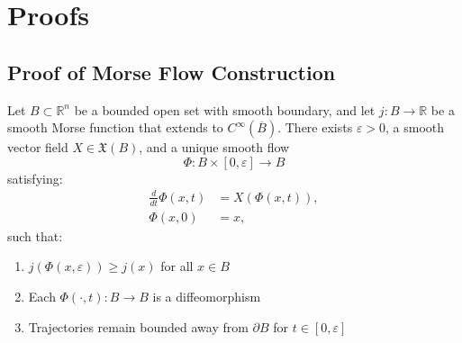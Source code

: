 \newpage
\appendix
\onecolumn

\section{Proofs}
\subsection{Proof of Morse Flow Construction}
\label{proof morse flow construction}
\begin{proposition}
\label{thm:main-generalized}
Let \( B \subset \mathbb{R}^n \) be a bounded open set with smooth boundary, and let \( j: B \to \mathbb{R} \) be a smooth Morse function that extends to \( C^\infty(\overline{B}) \). There exists \( \varepsilon > 0 \), a smooth vector field \( X \in \mathfrak{X}(B) \), and a unique smooth flow
\[
\Phi: B \times [0,\varepsilon] \to B
\]
satisfying:
\begin{align*}
\frac{d}{dt} \Phi(x,t) &= X(\Phi(x,t)), \\
\Phi(x,0) &= x,
\end{align*}
such that:
\begin{enumerate}
\item \( j(\Phi(x,\varepsilon)) \geq j(x) \) for all \( x \in B \)
\item Each \( \Phi(\cdot,t): B \to B \) is a diffeomorphism
\item Trajectories remain bounded away from \( \partial B \) for \( t \in [0,\varepsilon] \)
\end{enumerate}
\end{proposition}

